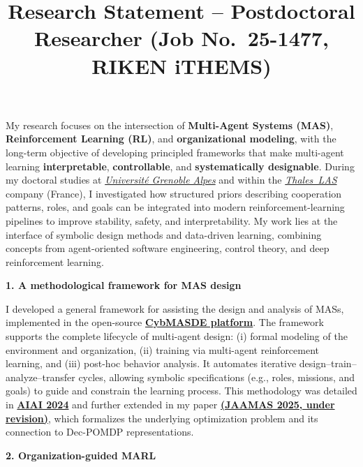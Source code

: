 \documentclass[11pt,a4paper,sans]{moderncv}
\title{Research Statement -- Postdoctoral Researcher (Job No.~25-1477, RIKEN iTHEMS)}
\begin{document}
\recipient{\phantom{a}}{\phantom{a}}
\date{}
\opening{}
\closing{{\phantom{s}}}

\makelettertitle

\justifying

\vspace{-2.5cm}
\noindent
My research focuses on the intersection of \textbf{Multi-Agent Systems (MAS)}, \textbf{Reinforcement Learning (RL)}, and \textbf{organizational modeling}, with the long-term objective of developing principled frameworks that make multi-agent learning \textbf{interpretable}, \textbf{controllable}, and \textbf{systematically designable}. During my doctoral studies at \href{https://www.univ-grenoble-alpes.fr/english/}{\textit{Université Grenoble Alpes}} and within the \href{https://www.thalesgroup.com/}{\textit{Thales~LAS}} company (France), I investigated how structured priors describing cooperation patterns, roles, and goals can be integrated into modern reinforcement-learning pipelines to improve stability, safety, and interpretability. My work lies at the interface of symbolic design methods and data-driven learning, combining concepts from agent-oriented software engineering, control theory, and deep reinforcement learning.

\bigskip
\textbf{1. A methodological framework for MAS design}

\noindent
I developed a general framework for assisting the design and analysis of MASs, implemented in the open-source \href{https://github.com/julien6/CybMASDE}{\textbf{CybMASDE platform}}. The framework supports the complete lifecycle of multi-agent design: (i) formal modeling of the environment and organization, (ii) training via multi-agent reinforcement learning, and (iii) post-hoc behavior analysis. It automates iterative design–train–analyze–transfer cycles, allowing symbolic specifications (e.g., roles, missions, and goals) to guide and constrain the learning process.
This methodology was detailed in \href{https://link.springer.com/chapter/10.1007/978-3-031-63223-5_24}{\textbf{AIAI 2024}} and further extended in my paper \href{https://sciety-labs.elifesciences.org/articles/by?article_doi=10.21203/rs.3.rs-7166037/v1}{\textbf{(JAAMAS 2025, under revision)}}, which formalizes the underlying optimization problem and its connection to Dec-POMDP representations.

\bigskip
\textbf{2. Organization-guided MARL}
\end{document}
